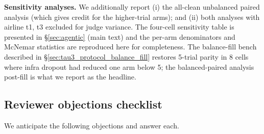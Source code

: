 \textbf{Sensitivity analyses.} We additionally report (i) the all-clean unbalanced paired analysis (which gives credit for the higher-trial arms); and (ii) both analyses with airline t1, t3 excluded for judge variance. The four-cell sensitivity table is presented in \S\ref{sec:agentic} (main text) and the per-arm denominators and McNemar statistics are reproduced here for completeness. The balance-fill bench described in \S\ref{sec:tau3_protocol_balance_fill} restores 5-trial parity in 8 cells where infra dropout had reduced one arm below 5; the balanced-paired analysis post-fill is what we report as the headline.

\subsection{Reviewer objections checklist}
\label{sec:tau3_reviewer_faq}

We anticipate the following objections and answer each.

